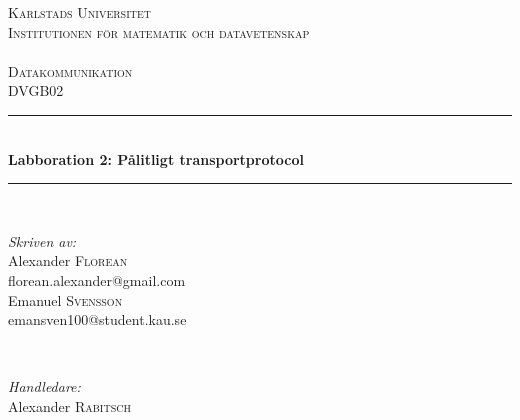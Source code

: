 \begin{titlepage}

\newcommand{\HRule}{\rule{\linewidth}{0.5mm}} %

\center %
 

 \textsc{\LARGE{Karlstads Universitet}\\ \small Institutionen för matematik och datavetenskap}\\
 \textsc{\Large \\Datakommunikation \\ \small DVGB02}\\ %



 \HRule \\[0.3cm]
 { \huge \bfseries Labboration 2: Pålitligt transportprotocol }\\[0.3cm] %
 \HRule \\[1.5cm]
  

  \begin{minipage}{0.4\textwidth}
  \begin{flushleft} \large
  \emph{Skriven av:}\\
  Alexander \textsc{Florean}\\
  florean.alexander@gmail.com\\ 
  Emanuel \textsc{Svensson}\\
  emansven100@student.kau.se\\
  \end{flushleft}
  \end{minipage}
  ~
  \begin{minipage}{0.4\textwidth}
  \begin{flushright} \large
  \emph{Handledare:}\\
  Alexander \textsc{Rabitsch} %
  

\end{flushright}
\end{minipage}
\end{titlepage}

